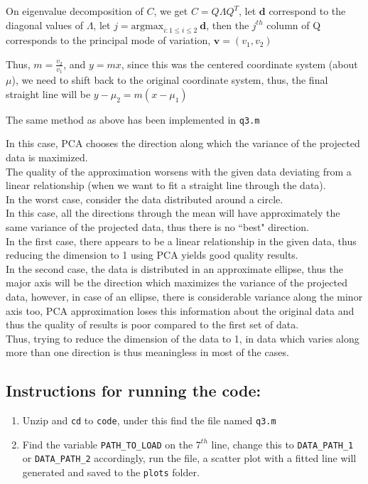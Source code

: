 \documentclass[11pt, fleqn]{article}
\begin{document}
\medskip
On eigenvalue decomposition of $C$, we get $C = Q\Lambda Q^T$, let $\mathbf{d}$ correspond to the diagonal values of $\Lambda$, let $j = \text{argmax}_{i: 1\le i\le 2} \ \mathbf{d}$, then the $j^{th}$ column of Q corresponds to the principal mode of variation, $\mathbf{v} = (v_1, v_2)$

\medskip
Thus, $m = \frac{v_2}{v_1}$, and $y = mx$, since this was the centered coordinate system (about $\mu$), we need to shift back to the original coordinate system, thus, the final straight line will be $y-\mu_2 = m(x - \mu_1)$

\medskip
The same method as above has been implemented in \texttt{q3.m}

\medskip
In this case, PCA chooses the direction along which the variance of the projected data is maximized.\\
The quality of the approximation worsens with the given data deviating from a linear relationship (when we want to fit a straight line through the data).\\
In the worst case, consider the data distributed around a circle.\\
In this case, all the directions through the mean will have approximately the same variance of the projected data, thus there is no ``best" direction.\\
In the first case, there appears to be a linear relationship in the given data, thus reducing the dimension to 1 using PCA yields good quality results.\\
In the second case, the data is distributed in an approximate ellipse, thus the major axis will be the direction which maximizes the variance of the projected data, however, in case of an ellipse, there is considerable variance along the minor axis too, PCA approximation loses this information about the original data and thus the quality of results is poor compared to the first set of data.\\
Thus, trying to reduce the dimension of the data to 1, in data which varies along more than one direction is thus meaningless in most of the cases.

\subsection*{Instructions for running the code:}
\begin{enumerate}[itemsep=-1ex]
    \item Unzip and \texttt{cd} to \texttt{code}, under this find the file named \texttt{q3.m}
    \item Find the variable \texttt{PATH\_TO\_LOAD} on the $7^{th}$ line, change this to \texttt{DATA\_PATH\_1} or \texttt{DATA\_PATH\_2} accordingly, run the file, a scatter plot with a fitted line will generated and saved to the \texttt{plots} folder.
\end{enumerate}
\end{document}
